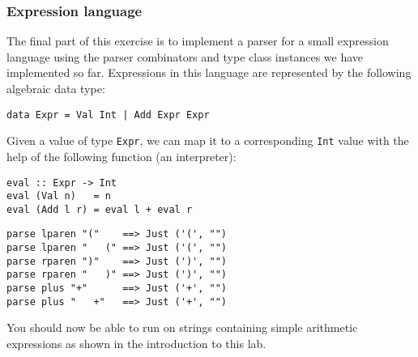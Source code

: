 \taskLine 

\subsubsection{Expression language}

The final part of this exercise is to implement a parser for a small expression language using the parser combinators and type class instances we have implemented so far. Expressions in this language are represented by the following algebraic data type:
\begin{verbatim}
data Expr = Val Int | Add Expr Expr
\end{verbatim}
Given a value of type \texttt{\small Expr}, we can map it to a corresponding \texttt{\small Int} value with the help of the following function (an interpreter):
\begin{verbatim}
eval :: Expr -> Int 
eval (Val n)   = n
eval (Add l r) = eval l + eval r
\end{verbatim}

\taskLine 

\begin{verbatim}
parse lparen "("    ==> Just ('(', "")
parse lparen "   (" ==> Just ('(', "")
parse rparen ")"    ==> Just (')', "")
parse rparen "   )" ==> Just (')', "")
parse plus "+"      ==> Just ('+', "")
parse plus "   +"   ==> Just ('+', "")
\end{verbatim}


You should now be able to run  on strings containing simple arithmetic expressions as shown in the introduction to this lab.

\taskLine 